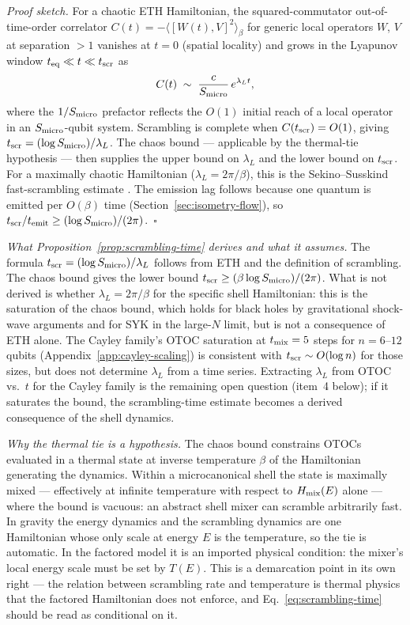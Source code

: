 \documentclass[12pt]{article}
\newcommand{\Smicro}{S_{\rm micro}}
\begin{document}
\emph{Proof sketch.}
For a chaotic ETH Hamiltonian, the squared-commutator out-of-time-order
correlator $C(t)=-\langle[W(t),V]^2\rangle_\beta$ for generic local
operators $W$, $V$ at separation $>1$ vanishes at $t=0$ (spatial
locality) and grows in the Lyapunov window $t_{\rm eq}\ll t\ll t_{\rm
scr}$ as
\[
  C(t) \;\sim\; \frac{c}{\Smicro}\,e^{\lambda_L t},
\]
where the $1/\Smicro$ prefactor reflects the $O(1)$ initial reach of a
local operator in an $\Smicro$-qubit system.  Scrambling is complete when
$C(t_{\rm scr})=O(1)$, giving $t_{\rm scr}=(\log\Smicro)/\lambda_L$.
The chaos bound --- applicable by the thermal-tie hypothesis --- then
supplies the upper bound on $\lambda_L$ and the
lower bound on $t_{\rm scr}$.  For a maximally chaotic Hamiltonian
($\lambda_L=2\pi/\beta$), this is the Sekino--Susskind fast-scrambling
estimate \cite{SekinoSusskind2008}.  The emission lag follows because one
quantum is emitted per $O(\beta)$ time (Section~\ref{sec:isometry-flow}),
so $t_{\rm scr}/t_{\rm emit}\ge(\log\Smicro)/(2\pi)$.~$\square$

\smallskip\noindent\emph{What Proposition~\ref{prop:scrambling-time} derives and what it assumes.}
The formula $t_{\rm scr}=(\log\Smicro)/\lambda_L$ follows from ETH and
the definition of scrambling.  The chaos bound gives the lower bound
$t_{\rm scr}\ge(\beta\log\Smicro)/(2\pi)$.
What is not derived is whether $\lambda_L=2\pi/\beta$ for the specific
shell Hamiltonian: this is the saturation of the chaos bound, which holds
for black holes by gravitational shock-wave arguments \cite{ShenkerStanford2014}
and for SYK in the large-$N$ limit, but is not a consequence of ETH
alone.  The Cayley family's OTOC saturation at $t_{\rm mix}=5$
steps for $n=6$--$12$ qubits (Appendix~\ref{app:cayley-scaling}) is
consistent with $t_{\rm scr}\sim O(\log n)$ for those sizes, but does
not determine $\lambda_L$ from a time series.  Extracting $\lambda_L$
from OTOC vs.\ $t$ for the Cayley family is the remaining open question
(item~4 below); if it saturates the bound, the scrambling-time estimate
becomes a derived consequence of the shell dynamics.

\smallskip\noindent\emph{Why the thermal tie is a hypothesis.}  The chaos
bound constrains OTOCs evaluated in a thermal state at inverse temperature
$\beta$ of the Hamiltonian generating the dynamics.  Within a
microcanonical shell the state is maximally mixed --- effectively at
infinite temperature with respect to $H_{\rm mix}(E)$ alone --- where the
bound is vacuous: an abstract shell mixer can scramble arbitrarily fast.
In gravity the energy dynamics and the scrambling dynamics are one
Hamiltonian whose only scale at energy $E$ is the temperature, so the tie
is automatic.  In the factored model it is an imported physical condition:
the mixer's local energy scale must be set by $T(E)$.  This is a
demarcation point in its own right --- the relation between scrambling
rate and temperature is thermal physics that the factored Hamiltonian does
not enforce, and Eq.~\eqref{eq:scrambling-time} should be read as
conditional on it.
\end{document}
